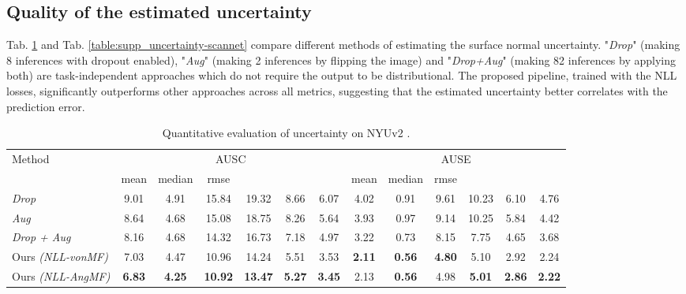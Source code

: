 \documentclass[10pt,twocolumn,letterpaper]{article}
\begin{document}
\subsection{Quality of the estimated uncertainty}

Tab. \ref{table:supp_uncertainty-nyu} and Tab. \ref{table:supp_uncertainty-scannet} compare different methods of estimating the surface normal uncertainty. "\textit{Drop}" (making 8 inferences with dropout enabled), "\textit{Aug}" (making 2 inferences by flipping the image) and "\textit{Drop+Aug}" (making 82 inferences by applying both) are task-independent approaches which do not require the output to be distributional. The proposed pipeline, trained with the NLL losses, significantly outperforms other approaches across all metrics, suggesting that the estimated uncertainty better correlates with the prediction error.

\begin{table}[h]
\normalsize
\setlength\tabcolsep{1.5pt}
\begin{center}
\begin{tabular}{l|cccccc|cccccc}
\toprule
\multirow{2}{4em}{Method} & \multicolumn{6}{c|}{AUSC } &
\multicolumn{6}{c}{AUSE }\\
\cline{2-13}
& {\small mean} & {\small median} & {\small rmse} & {\footnotesize } & {\footnotesize } & {\footnotesize } & {\small mean} & {\small median} & {\small rmse} & {\footnotesize } & {\footnotesize } & {\footnotesize }\\
\midrule
\textit{Drop}
& 9.01 & 4.91 & 15.84 & 19.32 & 8.66 & 6.07
& 4.02 & 0.91 & 9.61 & 10.23 & 6.10 & 4.76\\
\textit{Aug} 
& 8.64 & 4.68 & 15.08 & 18.75 & 8.26 & 5.64
& 3.93 & 0.97 & 9.14 & 10.25 & 5.84 & 4.42\\
\textit{Drop + Aug} 
& 8.16 & 4.68 & 14.32 & 16.73 & 7.18 & 4.97
& 3.22 & 0.73 & 8.15 & 7.75 & 4.65 & 3.68\\
\hline
Ours \textit{(NLL-vonMF)} 
& 7.03 & 4.47 & 10.96 & 14.24 & 5.51 & 3.53
& \textbf{2.11} & \textbf{0.56} & \textbf{4.80} & 5.10 & 2.92 & 2.24\\
Ours \textit{(NLL-AngMF)} 
& \textbf{6.83} & \textbf{4.25} & \textbf{10.92} & \textbf{13.47} & \textbf{5.27} & \textbf{3.45}
& 2.13 & \textbf{0.56} & 4.98 & \textbf{5.01} & \textbf{2.86} & \textbf{2.22}\\
\bottomrule
\end{tabular}
\end{center}
\caption{Quantitative evaluation of uncertainty on NYUv2 \cite{NYUv2}.}
\label{table:supp_uncertainty-nyu}
\end{table}
\end{document}
